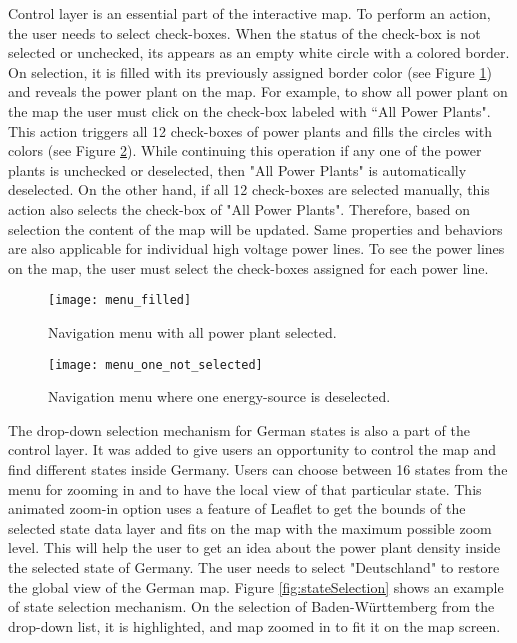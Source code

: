 Control layer is an essential part of the interactive map. To perform an action, the user needs to select check-boxes. When the status of the check-box is not selected or unchecked, its appears as an empty white circle with a colored border. On selection, it is filled with its previously assigned border color (see Figure \ref{fig:menufilled}) and reveals the power plant on the map. For example, to show all power plant on the map the user must click on the check-box labeled with “All Power Plants". This action triggers all 12 check-boxes of power plants and fills the circles with colors (see Figure \ref{fig:menu2}). While continuing this operation if any one of the power plants is unchecked or deselected, then "All Power Plants" is automatically deselected.  On the other hand, if all 12 check-boxes are selected manually, this action also selects the check-box of "All Power Plants". Therefore, based on selection the content of the map will be updated. Same properties and behaviors are also applicable for individual high voltage power lines. To see the power lines on the map, the user must select the check-boxes assigned for each power line. 

\begin{figure} [H]
  \begin{center}
    \texttt{[image: menu\_filled]}
    \caption{Navigation menu with all power plant selected.}
    \label{fig:menufilled}
  \end{center}
\end{figure}

\begin{figure} [H]
  \begin{center}
    \texttt{[image: menu\_one\_not\_selected]}
    \caption{Navigation menu where one energy-source is deselected.}
    \label{fig:menu2}
  \end{center}
\end{figure}

The drop-down selection mechanism for German states is also a part of the control layer. It was added to give users an opportunity to control the map and find different states inside Germany. Users can choose between 16 states from the menu for zooming in and to have the local view of that particular state. This animated zoom-in option uses a feature of Leaflet to get the bounds of the selected state data layer and fits on the map with the maximum possible zoom level. This will help the user to get an idea about the power plant density inside the selected state of Germany. The user needs to select "Deutschland" to restore the global view of the German map. Figure \ref{fig:stateSelection} shows an example of state selection mechanism. On the selection of Baden-Württemberg from the drop-down list, it is highlighted, and map zoomed in to fit it on the map screen.

